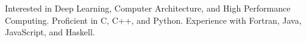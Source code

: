 \begin{cvparagraph}
Interested in Deep Learning, Computer Architecture, and High Performance Computing. Proficient in C, C++, and Python. Experience with Fortran, Java, JavaScript, and Haskell.
\end{cvparagraph}
